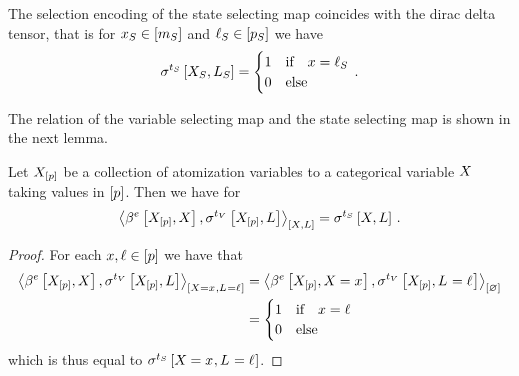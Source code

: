 The selection encoding of the state selecting map coincides with the dirac delta tensor, that is for $x_{S}\in[m_{S}]$ and $\ell_{S}\in[p_{S}]$ we have
\begin{align*}
    \sigma^{t_{S}}\left[X_{S},L_{S}\right] =
    \begin{cases}
        1 & \text{if}\quad x = \ell_{S} \\
        0 & \text{else}
    \end{cases} \, .
\end{align*}

The relation of the variable selecting map and the state selecting map is shown in the next lemma.

\begin{lemma}
    \label{lem:stateSelectorVsVariableSelector}
    Let $X_{[p]}$ be a collection of atomization variables to a categorical variable $X$ taking values in $[p]$.
    Then we have for
    \begin{align*}
        \contractionof{\bencodingofat{\categoricalmap}{\catvariableof{[\seldim]},\catvariable},
            \sencvselectionmapat{\catvariableof{[\seldim]},\selvariable}
        }{\catvariable,\selvariable}
        =
        \sencsselectionmapat{\catvariable,\selvariable} \, .
    \end{align*}
\end{lemma}
\begin{proof}
    For each $x,\ell\in[p]$ we have that
    \begin{align*}
        \contractionof{\bencodingofat{\categoricalmap}{\catvariableof{[\seldim]},\catvariable},
            \sencvselectionmapat{\catvariableof{[\seldim]},\selvariable}
        }{\indexedcatvariable,\indexedselvariable}
        &=
        \contraction{\bencodingofat{\categoricalmap}{\catvariableof{[\seldim]},\indexedcatvariable},
            \sencvselectionmapat{\catvariableof{[\seldim]},\indexedselvariable}
        } \\
        &= \begin{cases}
               1 & \ifspace \catindex = \selindex \\
               0 & \text{else}
        \end{cases}
    \end{align*}
    which is thus equal to $\sigma^{t_{S}}\left[X_{}=x_{},L_{}=\ell_{}\right]$.
\end{proof}

